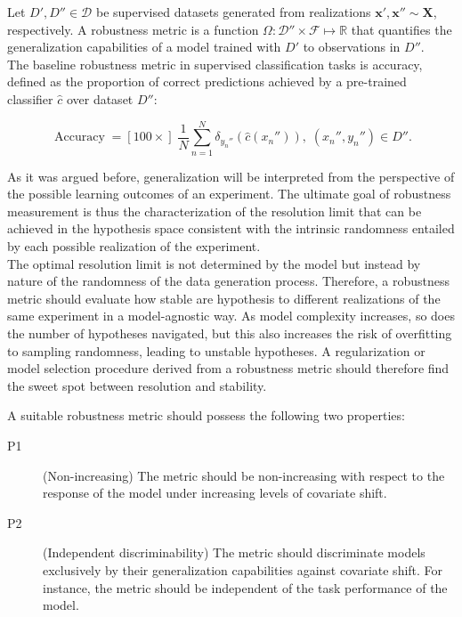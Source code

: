 \begin{definition}
    Let $D', D'' \in \mathcal{D}$ be supervised datasets generated from realizations $\bm{x}', \bm{x}'' \sim \bm{X}$,
    respectively. 
    A robustness metric is a function $\Omega: \mathcal{D}'' \times \mathcal{F} \longmapsto \mathbb{R}$ 
    that quantifies the generalization capabilities of a model trained with $D'$ to observations in $D''$. \\

    The baseline robustness metric in supervised classification tasks is
    accuracy, defined as the proportion of correct predictions 
    achieved by a pre-trained classifier $\hat{c}$ over 
    dataset $D''$:

    $$
    \operatorname{Accuracy} = [100 \times] \; \frac{1}{N} \sum_{n=1}^N \delta_{y_n''} \left ( \hat{c}(x_n'') \right ), \; (x_n'', y_n'') \in D''.
    $$

\end{definition}

As it was argued before, generalization will be interpreted from the 
perspective of the possible learning outcomes of an experiment. The ultimate goal 
of robustness measurement is thus the characterization of the resolution
limit that can be achieved in the hypothesis space 
consistent with the intrinsic randomness entailed by each 
possible realization of the experiment. \\

The optimal resolution limit is not determined by the model but instead by 
nature of the randomness of the data generation process. 
Therefore, a robustness metric should evaluate how stable are hypothesis 
to different realizations of the same experiment in a model-agnostic way. As model 
complexity increases, so does the number of hypotheses navigated, but this
also increases the risk of overfitting to sampling randomness, leading to unstable 
hypotheses. A regularization or model selection procedure derived from a robustness metric 
should therefore find the sweet spot between resolution and stability. \\

\begin{proposition}\label{properties:robustness}
    A suitable robustness metric should possess the following two properties:
\begin{description}
    \item[P1](Non-increasing) The metric should be non-increasing with respect to the
    response of the model under increasing levels of covariate shift.
    \item[P2](Independent discriminability) The metric should discriminate models exclusively by their generalization capabilities against 
    covariate shift. For instance, the metric should be independent of the task
    performance of the model.
\end{description}
\end{proposition}

